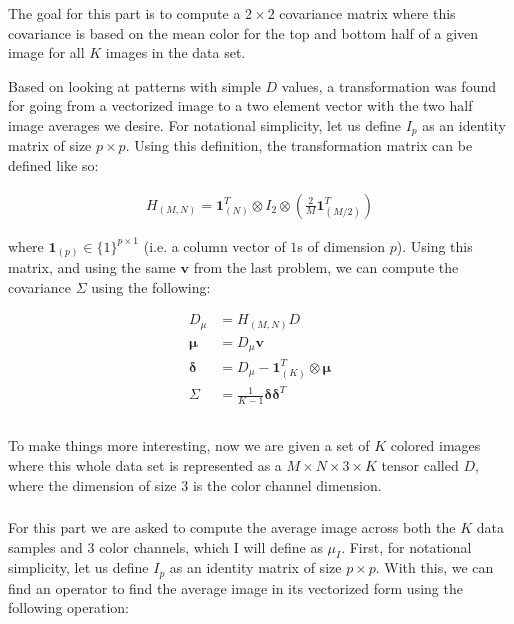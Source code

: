\documentclass{article}[12pt]
\begin{document}
	\subsubsection{}
	The goal for this part is to compute a $2 \times 2$ covariance matrix where this covariance is based on the mean color for the top and bottom half of a given image for all $K$ images in the data set. 
	
	Based on looking at patterns with simple $D$ values, a transformation was found for going from a vectorized image to a two element vector with the two half image averages we desire. For notational simplicity, let us define $I_p$ as an identity matrix of size $p \times p$. Using this definition, the transformation matrix can be defined like so:
	
	\begin{align*}
	H_{(M,N)} = \boldsymbol{1}_{(N)}^{T} \otimes I_2 \otimes \left( \frac{2}{M} \boldsymbol{1}_{(M/2)}^{T}\right)
	\end{align*}
	
	where $\boldsymbol{1}_{(p)} \in \{1 \}^{p \times 1}$ (i.e. a column vector of $1$s of dimension $p$). Using this matrix, and using the same $\boldsymbol{v}$ from the last problem, we can compute the covariance $\Sigma$ using the following:
	
	\begin{align*}
	D_{\mu} &= H_{(M,N)}D \\
	\boldsymbol{\mu} &= D_{\mu} \boldsymbol{v} \\
	\boldsymbol{\delta} &= D_{\mu} - \boldsymbol{1}_{(K)}^{T} \otimes \boldsymbol{\mu} \\
	\Sigma &= \frac{1}{K-1} \boldsymbol{\delta} \boldsymbol{\delta}^{T}
	\end{align*}
	
	\subsection{}
	To make things more interesting, now we are given a set of $K$ colored images where this whole data set is represented as a $M \times N \times 3 \times K$ tensor called $D$, where the dimension of size 3 is the color channel dimension.
	
	\subsubsection{}
	For this part we are asked to compute the average image across both the $K$ data samples and $3$ color channels, which I will define as $\mu_I$. First, for notational simplicity, let us define $I_p$ as an identity matrix of size $p \times p$. With this, we can find an operator to find the average image in its vectorized form using the following operation:
	
\end{document}
